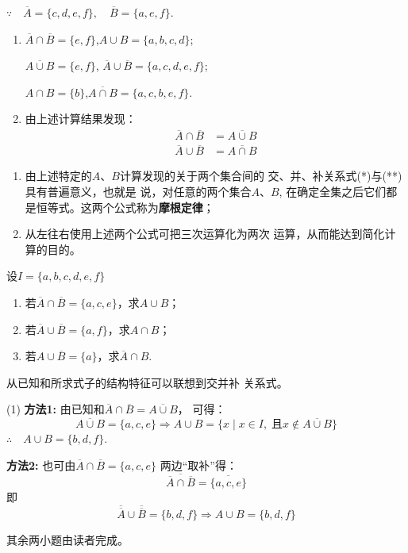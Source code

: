 \begin{solution}
    $\because\quad \overline{A}=\{c,d,e,f\},\quad \overline{B}=\{a,e, f\}$.
\begin{enumerate}[(1)]
    \item $\overline{A}\cap \overline{B}=\{e, f\}$,\quad  $A\cup B=\{a,b,c,d\}$;
    
 $\overline{A\cup B}=\{e,f\}$, \quad $\overline{A}\cup\overline{B}=\{a,c,d,e,f\}$;

$A\cap B=\{b\}$,\quad  $\overline{A\cap B}=\{a,c,b,e,f\}$.

\item 由上述计算结果发现：
\begin{align}
    \overline{A}\cap\overline{B}&=\overline{A\cup B}\tag{*}\\
    \overline{A}\cup\overline{B}&=\overline{A\cap B}\tag{**}
\end{align}
\end{enumerate}

\end{solution}

\begin{note}
\begin{enumerate}
    \item 由上述特定的$A$、$B$计算发现的关于两个集合间的
    交、并、补关系式(*)与(**)具有普遍意义，也就是
    说，对任意的两个集合$A$、$B$, 在确定全集之后它们都是恒等式。这两个公式称为\textbf{摩根定律}；
    \item 从左往右使用上述两个公式可把三次运算化为两次
    运算，从而能达到简化计算的目的。
\end{enumerate}
\end{note}

\begin{example}
设$I=\{a,b,c,d,e,f\}$
\begin{enumerate}[(1)]
    \item 若$\overline{A}\cap \overline{B}=\{a,c,e\}$，求$A\cup B$；
    \item 若$\overline{A}\cup \overline{B}=\{a,f\}$，求$A\cap B$；
    \item 若${A}\cup \overline{B}=\{a\}$，求$\overline{A}\cap B$.
\end{enumerate}
\end{example}

\begin{analyze}
    从已知和所求式子的结构特征可以联想到交并补
关系式。
\end{analyze}

\begin{solution}
(1) \textbf{方法1:} 由已知和$\overline{A}\cap\overline{B}=\overline{A\cup B}$，
可得：
\[\overline{A\cup B}=\{a,c,e\}\Longrightarrow A\cup B=\{x\mid x\in I,\; \text{且}x\notin \overline{A\cup B}\}\]
$\therefore\quad A\cup B=\{b,d,f\}$.

\textbf{方法2:} 也可由$\overline{A}\cap \overline{B}=\{a,c,e\}$
两边“取补”得：
\[\overline{\overline{A}\cap \overline{B}} =\overline{\{a,c,e\}}\]
即
\[\overline{\overline{A}}\cup \overline{\overline{B}}=\{b,d,
f\}\Longrightarrow A\cup B=\{b,d,f\}\]

其余两小题由读者完成。    
\end{solution}


